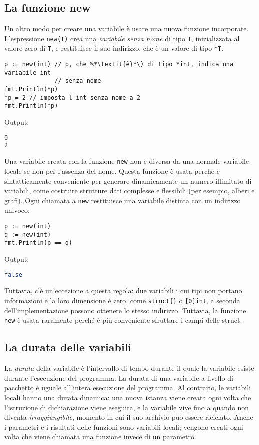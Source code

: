 \subsection{La funzione new}
\label{subsec:la_funzione_new}%
Un altro modo per creare una variabile è usare una nuova funzione incorporate.
L'espressione \verb|new(T)| crea una \textit{variabile senza nome} di tipo \verb|T|, inizializzata al valore zero di \verb|T|, e restituisce il suo indirizzo, che è un valore di tipo \verb|*T|.
\begin{lstlisting}[frame=single, label={lst:lstlisting1-3-3.1}]
p := new(int) // p, che %*\textit{è}*\) di tipo *int, indica una variabile int
              // senza nome
fmt.Println(*p)
*p = 2 // imposta l'int senza nome a 2
fmt.Println(*p)
\end{lstlisting}
Output:
\begin{lstlisting}[language=bash, frame=L, label={lst:lstlisting1-3-3.2}]
0
2
\end{lstlisting}
Una variabile creata con la funzione \verb|new| non è diversa da una normale variabile locale se non per l'assenza del nome.
Questa funzione è usata perché è sintatticamente conveniente per generare dinamicamente un numero illimitato di variabili, come costruire strutture dati complesse e flessibili (per esempio, alberi e grafi).
Ogni chiamata a \verb|new| restituisce una variabile distinta con un indirizzo univoco:
\begin{lstlisting}[frame=single, label={lst:lstlisting1-3-3.3}]
p := new(int)
q := new(int)
fmt.Println(p == q)
\end{lstlisting}
Output:
\begin{lstlisting}[language=bash, frame=L, label={lst:lstlisting1-3-3.4}]
false
\end{lstlisting}
Tuttavia, c'è un'eccezione a questa regola: due variabili i cui tipi non portano informazioni e la loro dimensione è zero, come \verb|struct{}| o \verb|[0]int|, a seconda dell'implementazione possono ottenere lo stesso indirizzo.
Tuttavia, la funzione \verb|new| è usata raramente perché è più conveniente sfruttare i campi delle struct.

\subsection{La durata delle variabili}
\label{subsec:la_durata_delle_variabili}%
La \textit{durata} della variabile è l'intervallo di tempo durante il quale la variabile esiste durante l'esecuzione del programma.
La durata di una variabile a livello di pacchetto è uguale all'intera esecuzione del programma.
Al contrario, le variabili locali hanno una durata dinamica: una nuova istanza viene creata ogni volta che l'istruzione di dichiarazione viene eseguita, e la variabile vive fino a quando non diventa \textit{irraggiungibile}, momento in cui il suo archivio può essere riciclato.
Anche i parametri e i risultati delle funzioni sono variabili locali;
vengono creati ogni volta che viene chiamata una funzione invece di un parametro.

